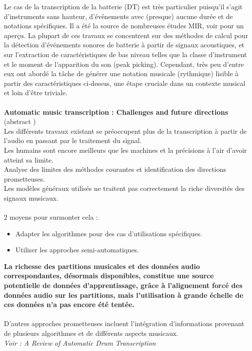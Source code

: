 
Le cas de la transcription de la batterie (DT) est très particulier puisqu'il s'agit d'instruments sans hauteur, d'événements avec (presque) aucune durée et de notations spécifiques. Il a été la source de nombreuses études MIR, voir \cite{8350302} pour un aperçu. La plupart de ces travaux se concentrent sur des méthodes de calcul pour la détection d'événements sonores de batterie à partir de signaux acoustiques, et sur l'extraction de caractéristiques de bas niveau telles que la classe d'instrument et le moment de l'apparition du son (peak picking). Cependant, très peu d'entre eux ont abordé la tâche de générer une notation musicale (rythmique) lisible à partir des caractéristiques ci-dessus, une étape cruciale dans un contexte musical et loin d'être triviale.\\\\
\textbf{Automatic music transcription : Challenges and future directions} \cite{article1}\\

(abstract \cite{article1})\\
Les différents travaux existant se préoccupent plus de la transcription à partir de l’audio en passant par le traitement du signal.\\
Les humains sont encore meilleurs que les machines et la précisions à l’air d’avoir atteint sa limite.\\
Analyse des limites des méthodes courantes et identification des directions prometteuses.\\
Les modèles généraux utilisés ne traitent pas correctement la riche diversités des signaux musicaux.\\\\
2 moyens pour surmonter cela :
\begin{itemize}
	\item Adapter les algorithmes pour des cas d’utilisations spécifiques.
	\item Utiliser les approches semi-automatiques.\\
\end{itemize}
\textbf{La richesse des partitions musicales et des données audio correspondantes, désormais disponibles, constitue une source potentielle de données d'apprentissage, grâce à l'alignement forcé des données audio sur les partitions, mais l'utilisation à grande échelle de ces données n'a pas encore été tentée.}\\\\
D'autres approches prometteuses incluent l'intégration d'informations provenant de plusieurs algorithmes et de différents aspects musicaux.\\
\textit{Voir : A Review of Automatic Drum Transcription}\cite{8350302}
